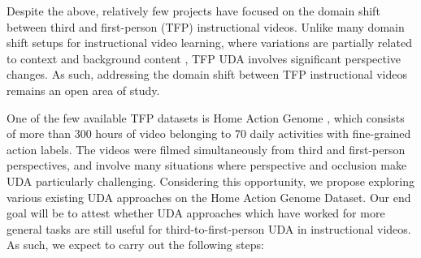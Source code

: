 \documentclass[final]{cvpr}
\begin{document}
Despite the above, relatively few projects have focused on the domain shift between third and first-person (TFP) instructional videos. Unlike many domain shift setups for instructional video learning, where variations are partially related to context and background content \cite{Damen2020-az}, TFP UDA involves significant perspective changes. As such, addressing the domain shift between TFP instructional videos remains an open area of study. 

One of the few available TFP datasets is Home Action Genome \cite{Rai2021-wg}, which consists of more than 300 hours of video belonging to 70 daily activities with fine-grained action labels. The videos were filmed simultaneously from third and first-person perspectives, and involve many situations where perspective and occlusion make UDA particularly challenging. Considering this opportunity, we propose exploring various existing UDA approaches on the Home Action Genome Dataset. Our end goal will be to attest whether UDA approaches which have worked for more general tasks are still useful for third-to-first-person UDA in instructional videos. As such, we expect to carry out the following steps:

\end{document}
